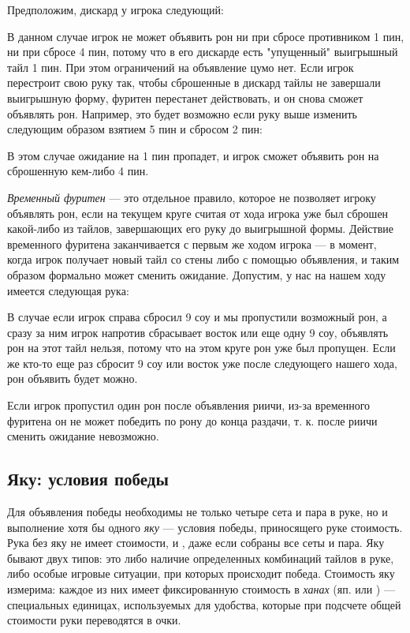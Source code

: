 
Предположим, дискард у игрока следующий:


В данном случае игрок не может объявить рон ни при сбросе противником 1 пин, ни при сбросе 4 пин, потому что в его дискарде есть "упущенный" выигрышный тайл 1 пин. При этом ограничений на объявление цумо нет. Если игрок перестроит свою руку так, чтобы сброшенные в дискард тайлы не завершали выигрышную форму, фуритен перестанет действовать, и он снова сможет объявлять рон. Например, это будет возможно если руку выше изменить следующим образом взятием 5 пин и сбросом 2 пин: 


В этом случае ожидание на 1 пин пропадет, и игрок сможет объявить рон на сброшенную кем-либо 4 пин. 

\textit{Временный фуритен} --- это отдельное правило, которое не позволяет игроку объявлять рон, если на текущем круге считая от хода игрока уже был сброшен какой-либо из тайлов, завершающих его руку до выигрышной формы. Действие временного фуритена заканчивается с первым же ходом игрока --- в момент, когда игрок получает новый тайл со стены либо с помощью объявления, и таким образом формально может сменить ожидание. Допустим, у нас на нашем ходу имеется следующая рука:


В случае если игрок справа сбросил 9 соу и мы пропустили возможный рон, а сразу за ним игрок напротив сбрасывает восток или еще одну 9 соу, объявлять рон на этот тайл нельзя, потому что на этом круге рон уже был пропущен. Если же кто-то еще раз сбросит 9 соу или восток уже после следующего нашего хода, рон объявить будет можно.

Если игрок пропустил один рон после объявления риичи, из-за временного фуритена он не может победить по рону до конца раздачи, т. к. после риичи сменить ожидание невозможно.

\subsection{Яку: условия победы}

Для объявления победы необходимы не только четыре сета и пара в руке, но и выполнение хотя бы одного \textit{яку} --- условия победы, приносящего руке стоимость. Рука без яку не имеет стоимости, и , даже если собраны все сеты и пара. Яку бывают двух типов: это либо наличие определенных комбинаций тайлов в руке, либо особые игровые ситуации, при которых происходит победа. Стоимость яку измерима: каждое из них имеет фиксированную стоимость в \textit{ханах} (яп.  или ) --- специальных единицах, используемых для удобства, которые при подсчете общей стоимости руки переводятся в очки.

